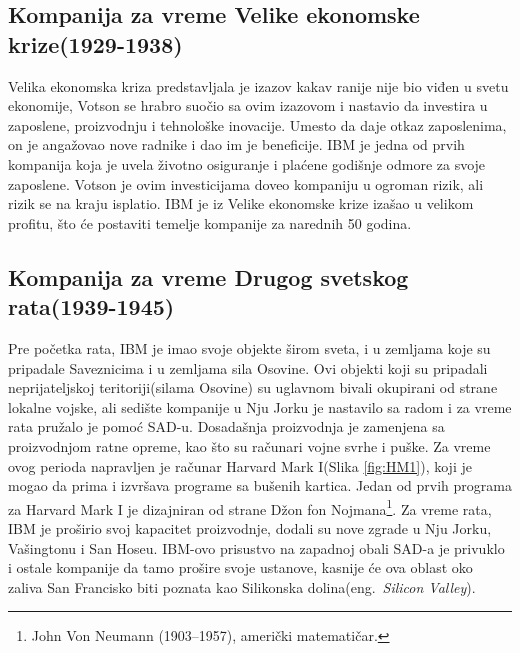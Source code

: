 \documentclass[a4paper]{article}
\begin{document}
\subsection{Kompanija za vreme Velike ekonomske krize(1929-1938)}
Velika ekonomska kriza predstavljala je izazov kakav ranije nije bio viđen u svetu ekonomije, Votson se hrabro suočio sa ovim izazovom i nastavio da investira u zaposlene, proizvodnju i tehnološke inovacije. Umesto da daje otkaz zaposlenima, on je angažovao nove radnike i dao im je beneficije. IBM je jedna od prvih kompanija koja je uvela životno osiguranje i plaćene godišnje odmore za svoje zaposlene. Votson je ovim investicijama doveo kompaniju u ogroman rizik, ali rizik se na kraju isplatio. IBM je iz Velike ekonomske krize izašao u velikom profitu, što će postaviti temelje kompanije za narednih 50 godina.
\subsection{Kompanija za vreme Drugog svetskog rata(1939-1945)}
Pre početka rata, IBM je imao svoje objekte širom sveta, i u zemljama koje su pripadale Saveznicima i u zemljama sila Osovine. Ovi objekti koji su pripadali neprijateljskoj teritoriji(silama Osovine) su uglavnom bivali okupirani od strane lokalne vojske, ali sedište kompanije u Nju Jorku je nastavilo sa radom i za vreme rata pružalo je pomoć SAD-u. Dosadašnja proizvodnja je zamenjena sa proizvodnjom ratne opreme, kao što su računari vojne svrhe i puške. Za vreme ovog perioda napravljen je računar Harvard Mark I(Slika \ref{fig:HM1}), koji je mogao da prima i izvršava programe sa bušenih kartica. Jedan od prvih programa za Harvard Mark I je dizajniran od strane Džon fon Nojmana\footnote[4]{John Von Neumann (1903–1957), američki matematičar.}. Za vreme rata, IBM je proširio svoj kapacitet proizvodnje, dodali su nove zgrade u Nju Jorku, Vašingtonu i San Hoseu. IBM-ovo prisustvo na zapadnoj obali SAD-a je privuklo i ostale kompanije da tamo prošire svoje ustanove, kasnije će ova oblast oko zaliva San Francisko biti poznata kao Silikonska dolina(eng.~{\em Silicon Valley}).
\end{document}
